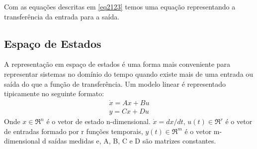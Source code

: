 Com as equações descritas em \ref{eq2123} temos uma equação representando a transferência da entrada para a saída.
\subsection{Espaço de Estados}
A representação em espaço de estados é uma forma mais conveniente para representar sistemas no domínio do tempo quando existe mais de uma entrada ou saída do que a função de transferência. Um modelo linear é representado tipicamente no seguinte formato:
\begin{equation}
\begin{array}{c}
\dot{x}=Ax+Bu\\
y=Cx+Du
\end{array}
\end{equation}
Onde $x \in \Re^n$ é o vetor de estado n-dimensional. $\dot{x}=dx/dt$, $u(t) \in \Re^r$ é o vetor de entradas formado por r funções temporais, $y(t) \in \Re^m$ é o vetor m-dimensional d saídas medidas e, A, B, C e D são matrizes constantes.


